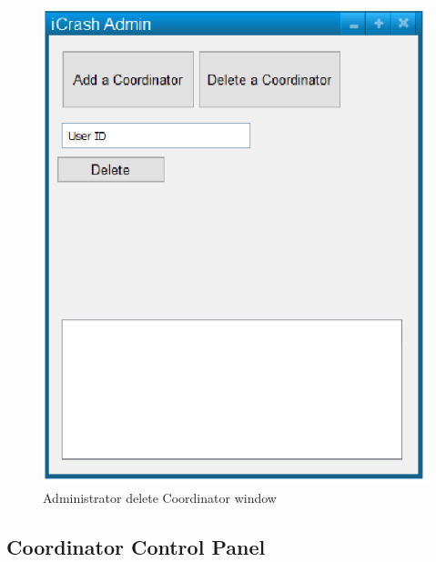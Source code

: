 \begin{figure}
  \centering
    \includegraphics[scale=0.75]{images/mockups/other/AdminDeleteCoordinator.eps}
  \caption{Administrator delete Coordinator window}
  \label{fig:AdminDelete}
\end{figure}


\subsection{Coordinator Control Panel}

